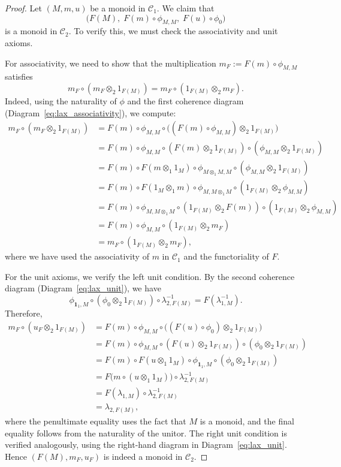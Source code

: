 \documentclass{amsart}
\begin{document}
\begin{proof}
Let $(M, m, u)$ be a monoid in $\mathcal{C}_1$. We claim that
\[
\bigl( F(M),\; F(m) \circ \phi_{M,M},\; F(u) \circ \phi_0 \bigr)
\]
is a monoid in $\mathcal{C}_2$. To verify this, we must check the associativity and unit axioms.

For associativity, we need to show that the multiplication $m_F := F(m) \circ \phi_{M,M}$ satisfies
\[
m_F \circ (m_F \otimes_2 1_{F(M)}) = m_F \circ (1_{F(M)} \otimes_2 m_F).
\]
Indeed, using the naturality of $\phi$ and the first coherence diagram (Diagram~\ref{eq:lax_associativity}), we compute:
\begin{align*}
m_F \circ (m_F \otimes_2 1_{F(M)})
&= F(m) \circ \phi_{M,M} \circ \bigl( (F(m) \circ \phi_{M,M}) \otimes_2 1_{F(M)} \bigr) \\
&= F(m) \circ \phi_{M,M} \circ (F(m) \otimes_2 1_{F(M)}) \circ (\phi_{M,M} \otimes_2 1_{F(M)}) \\
&= F(m) \circ F(m \otimes_1 1_M) \circ \phi_{M \otimes_1 M, M} \circ (\phi_{M,M} \otimes_2 1_{F(M)}) \\
&= F(m) \circ F(1_M \otimes_1 m) \circ \phi_{M, M \otimes_1 M} \circ (1_{F(M)} \otimes_2 \phi_{M,M}) \\
&= F(m) \circ \phi_{M, M \otimes_1 M} \circ (1_{F(M)} \otimes_2 F(m)) \circ (1_{F(M)} \otimes_2 \phi_{M,M}) \\
&= F(m) \circ \phi_{M,M} \circ (1_{F(M)} \otimes_2 m_F) \\
&= m_F \circ (1_{F(M)} \otimes_2 m_F),
\end{align*}
where we have used the associativity of $m$ in $\mathcal{C}_1$ and the functoriality of $F$.

For the unit axioms, we verify the left unit condition. By the second coherence diagram (Diagram~\ref{eq:lax_unit}), we have
\[
\phi_{\mathbf{1}_1, M} \circ (\phi_0 \otimes_2 1_{F(M)}) \circ \lambda_{2, F(M)}^{-1} = F(\lambda_{1,M}^{-1}).
\]
Therefore,
\begin{align*}
m_F \circ (u_F \otimes_2 1_{F(M)})
&= F(m) \circ \phi_{M,M} \circ \bigl( (F(u) \circ \phi_0) \otimes_2 1_{F(M)} \bigr) \\
&= F(m) \circ \phi_{M,M} \circ (F(u) \otimes_2 1_{F(M)}) \circ (\phi_0 \otimes_2 1_{F(M)}) \\
&= F(m) \circ F(u \otimes_1 1_M) \circ \phi_{\mathbf{1}_1, M} \circ (\phi_0 \otimes_2 1_{F(M)}) \\
&= F\bigl( m \circ (u \otimes_1 1_M) \bigr) \circ \lambda_{2, F(M)}^{-1} \\
&= F(\lambda_{1,M}) \circ \lambda_{2, F(M)}^{-1} \\
&= \lambda_{2, F(M)},
\end{align*}
where the penultimate equality uses the fact that $M$ is a monoid, and the final equality follows from the naturality of the unitor. The right unit condition is verified analogously, using the right-hand diagram in Diagram~\ref{eq:lax_unit}. Hence $(F(M), m_F, u_F)$ is indeed a monoid in $\mathcal{C}_2$.


\end{proof}
\end{document}

